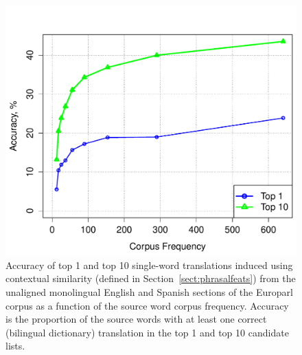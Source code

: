 \documentclass[11pt]{article}
\newcommand{\secref}[1]{Section~\ref{#1}}
\begin{document}
\begin{figure}[t]
\begin{center}
\includegraphics[width=\linewidth]{../figures/lexinductnew/lexinductnew.pdf}
\caption{Accuracy of top 1 and top 10 single-word translations induced using contextual similarity (defined in \secref{sect:phrasalfeats}) from the unaligned monolingual English and Spanish sections of the Europarl corpus as a function of the source word corpus frequency.  Accuracy is the proportion of the source words with at least one correct (bilingual dictionary) translation in the top 1 and top 10 candidate lists.}
\label{fig:lexinduct}
\end{center}
\vskip -0.2in
\end{figure}
\end{document}
